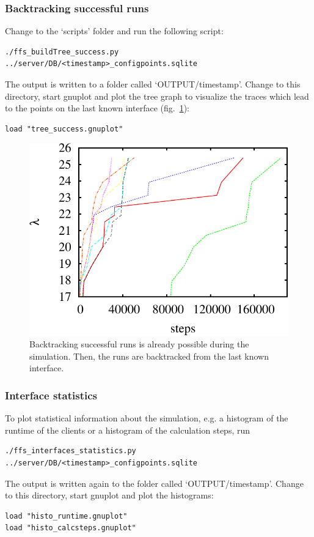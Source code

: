 \documentclass[a4paper,oneside]{article}
\newenvironment{mylisting}
{\begin{list}{}{\setlength{\leftmargin}{1em}}\item\scriptsize\bfseries}
{\end{list}}
\begin{document}
\subsubsection{Backtracking successful runs}
Change to the `scripts' folder and run the following script:
\begin{mylisting}
\begin{verbatim}
./ffs_buildTree_success.py ../server/DB/<timestamp>_configpoints.sqlite
\end{verbatim}
\end{mylisting}
The output is written to a folder called `OUTPUT/timestamp'. Change to this directory, start gnuplot and plot the tree graph to visualize the traces which lead to the points on the last known interface (fig.~\ref{fig:traces}):
\begin{mylisting}
\begin{verbatim}
load "tree_success.gnuplot"
\end{verbatim}
\end{mylisting}

\begin{figure}
 \centering
 \includegraphics[width=0.5\linewidth]{pics/traces}
 \caption{Backtracking successful runs is already possible during the simulation. Then, the runs are backtracked from the last known interface.}
 \label{fig:traces}
\end{figure}

\subsubsection{Interface statistics}
To plot statistical information about the simulation, e.g. a histogram of the runtime of the clients or a histogram of the calculation steps, run
\begin{mylisting}
\begin{verbatim}
./ffs_interfaces_statistics.py ../server/DB/<timestamp>_configpoints.sqlite
\end{verbatim}
\end{mylisting}
The output is written again to the folder called `OUTPUT/timestamp'. Change to this directory, start gnuplot and plot the histograms:
\begin{mylisting}
\begin{verbatim}
load "histo_runtime.gnuplot"
load "histo_calcsteps.gnuplot"
\end{verbatim}
\end{mylisting}
\end{document}
